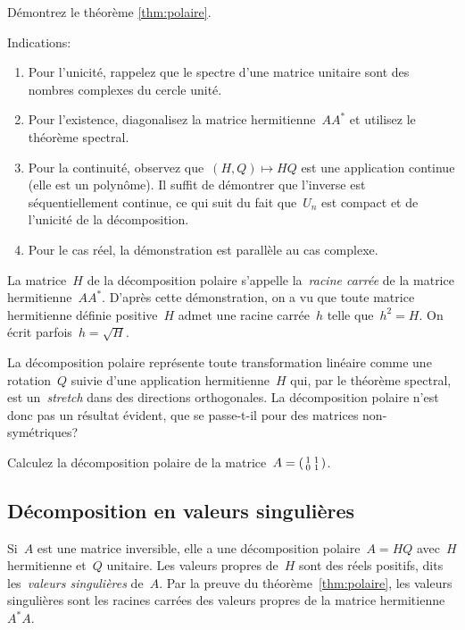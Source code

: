 \begin{exercice}
	Démontrez le théorème \ref{thm:polaire}.
\end{exercice}
\vspace{-1em}
Indications:
\begin{enumerate}
	\item Pour l'unicité, rappelez que le spectre d'une matrice
		unitaire sont des nombres complexes du cercle unité.
	\item Pour l'existence, diagonalisez la matrice hermitienne~$AA^*$ et
		utilisez le théorème spectral.
	\item Pour la continuité, observez que~$(H,Q)\mapsto HQ$ est une
		application continue (elle est un polynôme).  Il suffit de démontrer
		que l'inverse est séquentiellement continue, ce qui suit du fait
		que~$U_n$ est compact et de l'unicité de la décomposition.
	\item Pour le cas réel, la démonstration est parallèle au cas complexe.
\end{enumerate}

La matrice~$H$ de la décomposition polaire s'appelle la~\emph{racine carrée}
de la matrice hermitienne~$AA^*$.  D'après cette démonstration, on a vu que
toute matrice hermitienne définie positive~$H$ admet une racine carrée~$h$
telle que~$h^2=H$.  On écrit parfois~$h=\sqrt H$.

La décomposition polaire représente toute transformation linéaire comme une
rotation~$Q$ suivie d'une application hermitienne~$H$ qui, par le théorème
spectral, est un~\emph{stretch} dans des directions orthogonales.  La
décomposition polaire n'est donc pas un résultat évident, que se passe-t-il
pour des matrices non-symétriques?

\begin{exercice}[difficile]
	Calculez la décomposition polaire de la
	matrice~$A=\left(\begin{smallmatrix}1&1\\0&1\end{smallmatrix}\right)$.
\end{exercice}

\subsection{Décomposition en valeurs singulières}

Si~$A$ est une matrice inversible, elle a une décomposition
polaire~$A=HQ$ avec~$H$ hermitienne et~$Q$ unitaire.  Les valeurs propres
de~$H$ sont des réels positifs, dits les~\emph{valeurs singulières} de~$A$.
Par la preuve du théorème~\ref{thm:polaire}, les valeurs singulières sont les
racines carrées des valeurs propres de la matrice hermitienne~$A^*A$.

